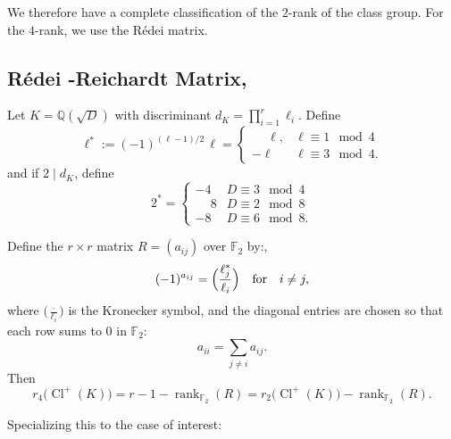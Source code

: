 \documentclass{article}
\numberwithin{equation}{section}
\theoremstyle{plain}  %
\theoremstyle{definition}
\newcommand{\Q}{\mathbb{Q}}
\newcommand{\F}{\mathbb{F}}
\newcommand{\Redei}{R\'edei }
\DeclareMathOperator{\rank}{rank}
\DeclareMathOperator{\Cl}{Cl}
\begin{document}
We therefore have a complete classification of the $2$-rank of the class group. For the $4$-rank, we use the \Redei matrix.

\subsection{\Redei-Reichardt Matrix, \texorpdfstring{\cite{MR1581397}}{cite}}
Let $K=\Q(\sqrt{D})$ with discriminant $d_K= \prod_{i=1}^r \ell_i$. Define $$
\ell^*:=(-1)^{(\ell-1)/2}\,\ell = \begin{cases}
\phantom{-}\ell,& \ell\equiv 1\mod 4 \\
-\ell & \ell\equiv 3\mod 4.
\end{cases}
$$
and if $2\mid d_K$, define
$$
2^*=\begin{cases}
-4 & D\equiv 3\mod 4 \\
\phantom{-}8 & D\equiv 2\mod 8 \\
-8 & D\equiv 6\mod 8.
\end{cases}
$$

Define the $r\times r$ matrix $R=(a_{ij})$ over $\F_2$ by:,
$$
(-1)^{a_{ij}}=\Bigl(\frac{\ell_j^*}{\ell_i}\Bigr) \quad \text{for} \quad i \neq j,
$$ 
where $\bigl(\frac{\cdot}{\ell_i}\bigr)$ is the Kronecker symbol,
and the diagonal entries are chosen so that each row sums to $0$ in $\F_2$:
$$
a_{ii}=\sum_{j\neq i} a_{ij}.
$$
Then 
$$
r_4\!\bigl(\Cl^+(K)\bigr)=r-1-\rank_{\F_2}(R)
= r_2\!\bigl(\Cl^+(K)\bigr)-\rank_{\F_2}(R).
$$

Specializing this to the case of interest: \\
\end{document}
